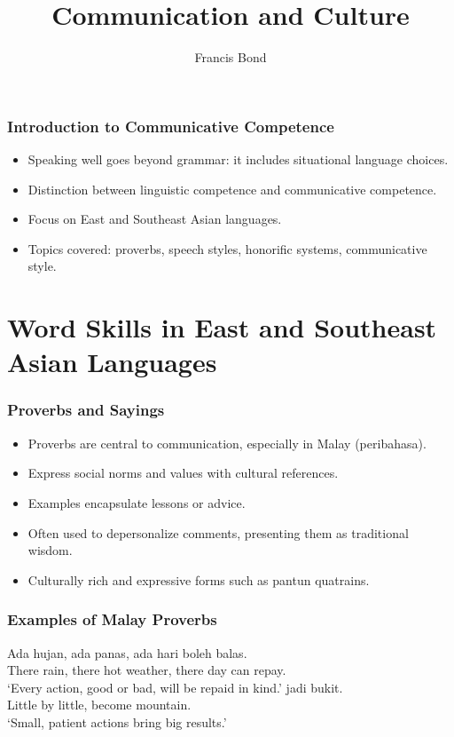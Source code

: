 \documentclass[xetex]{beamer}
\title{Communication and Culture}
\author{Francis Bond}
\date{}
\begin{document}
\frame{\titlepage}

\begin{frame}
\frametitle{Introduction to Communicative Competence}
\begin{itemize}
    \item Speaking well goes beyond grammar: it includes situational language choices.
    \item Distinction between linguistic competence and communicative competence.
    \item Focus on East and Southeast Asian languages.
    \item Topics covered: proverbs, speech styles, honorific systems, communicative style.
\end{itemize}
\end{frame}

\section{Word Skills in East and Southeast Asian Languages}
\begin{frame}
\frametitle{Proverbs and Sayings}
\begin{itemize}
    \item Proverbs are central to communication, especially in Malay (peribahasa).
    \item Express social norms and values with cultural references.
    \item Examples encapsulate lessons or advice.
    \item Often used to depersonalize comments, presenting them as traditional wisdom.
    \item Culturally rich and expressive forms such as pantun quatrains.
\end{itemize}
\end{frame}

\begin{frame}
\frametitle{Examples of Malay Proverbs}
\begin{exe}
    \ex \gll Ada hujan, ada panas, ada hari boleh balas. \\
        There rain, there {hot weather}, there day can repay.\\
        \trans `Every action, good or bad, will be repaid in kind.'
    \ex {} jadi bukit. \\
        {Little by little}, become mountain.\\
        \trans `Small, patient actions bring big results.'
\end{exe}
\end{frame}
\end{document}
